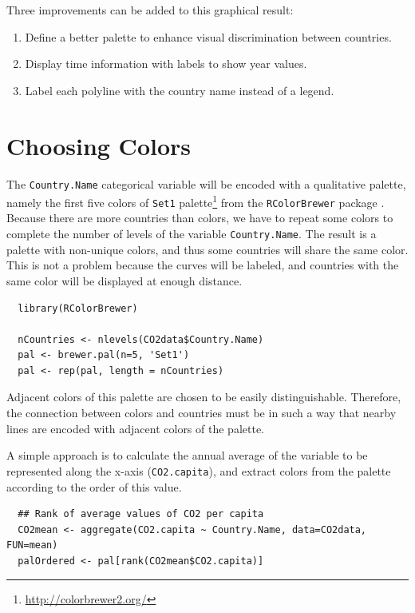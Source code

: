 \documentclass[smallroyalvopaper]{memoir}
\begin{document}
Three improvements can be added to this graphical result: 
\begin{enumerate}
\item Define a better palette to enhance visual discrimination between
countries.
\item Display time information with labels to show year values.
\item Label each polyline with the country name instead of a legend.
\end{enumerate}

\section{Choosing Colors}
\label{sec:org4b07690}
The \texttt{Country.Name} categorical variable will be encoded with a
qualitative palette, namely the first five colors of \texttt{Set1}
palette\footnote{\url{http://colorbrewer2.org/}} from the \texttt{RColorBrewer} package
\cite{Neuwirth2011}. Because there are more countries than colors, we
have to repeat some colors to complete the number of levels of the
variable \texttt{Country.Name}. The result is a palette with non-unique
colors, and thus some countries will share the same color. This is not
a problem because the curves will be labeled, and countries with the
same color will be displayed at enough distance.


\lstset{language=r,label= ,caption= ,captionpos=b,numbers=none}
\begin{lstlisting}
  library(RColorBrewer)
  
  nCountries <- nlevels(CO2data$Country.Name)
  pal <- brewer.pal(n=5, 'Set1')
  pal <- rep(pal, length = nCountries)
\end{lstlisting}

Adjacent colors of this palette are chosen to be easily
distinguishable. Therefore, the connection between colors and
countries must be in such a way that nearby lines are encoded
with adjacent colors of the palette.

A simple approach is to calculate the annual average of the
variable to be represented along the x-axis (\texttt{CO2.capita}), and
extract colors from the palette according to the order of this
value.  


\lstset{language=r,label= ,caption= ,captionpos=b,numbers=none}
\begin{lstlisting}
  ## Rank of average values of CO2 per capita
  CO2mean <- aggregate(CO2.capita ~ Country.Name, data=CO2data, FUN=mean)
  palOrdered <- pal[rank(CO2mean$CO2.capita)]  
\end{lstlisting}
\end{document}
